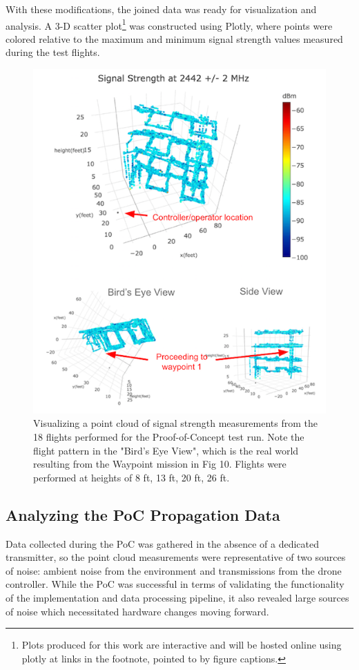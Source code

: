 \documentclass[pageno]{jpaper}
\begin{document}
With these modifications, the joined data was ready for visualization and analysis. A 3-D scatter plot\footnote{Plots produced for this work are interactive and will be hosted online using plotly at links in the footnote, pointed to by figure captions.} was constructed using Plotly, where points were colored relative to the maximum and minimum signal strength values measured during the test flights. 

\begin{figure}[!h]
 	\caption{Visualizing a point cloud of signal strength measurements from the 18 flights performed for the Proof-of-Concept test run. Note the flight pattern in the "Bird's Eye View", which is the real world  resulting from the Waypoint mission in Fig 10. Flights were performed at heights of 8 ft, 13 ft, 20 ft, 26 ft.}
 	\includegraphics{PoC_1}
 	\centering
\end{figure}

\subsection{Analyzing the PoC Propagation Data}
Data collected during the PoC was gathered in the absence of a dedicated transmitter, so the point cloud measurements were representative of two sources of noise: ambient noise from the environment and transmissions from the drone controller. While the PoC was successful in terms of validating the functionality of the implementation and data processing pipeline, it also revealed large sources of noise which necessitated hardware changes moving forward.
\end{document}
